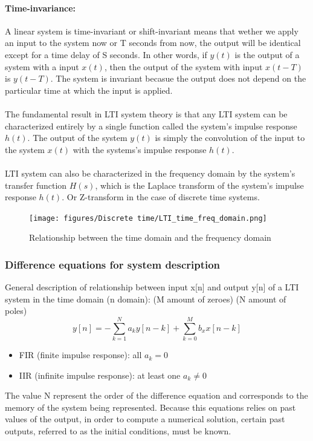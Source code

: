 \documentclass{article}
\begin{document}
\paragraph{Time-invariance:} 
A linear system is time-invariant or shift-invariant means that wether we apply an input to the system now or T seconds from now, the output will be identical except for a time delay of S seconds. In other words, if $y(t)$ is the output of a system with a input $x(t)$, then the output of the system with input $x(t-T)$ is $y(t-T)$. The system is invariant becasue the output does not depend on the particular time at which the input is applied.
\\
\\
The fundamental result in LTI system theory is that any LTI system can be characterized entirely by a single function called the system's impulse response $h(t)$. The output of the system $y(t)$ is simply the convolution of the input to the system $x(t)$ with the systems's impulse response $h(t)$.
\\
\\
LTI system can also be characterized in the frequency domain by the system's transfer function $H(s)$, which is the Laplace transform of the system's impulse response $h(t)$. Or Z-transform in the case of discrete time systems.
\begin{figure}[h!]
    \centering
    \texttt{[image: figures/Discrete time/LTI\_time\_freq\_domain.png]}
    \caption{Relationship between the time domain and the frequency domain}
    \label{fig:lti_relationship}
\end{figure}

\subsubsection{Difference equations for system description} %
General description of relationship between input x[n] and output y[n] of a LTI system in the time domain (n domain): (M amount of zeroes) (N amount of poles)
\begin{equation}
    y[n] = -\sum_{k=1}^{N}a_ky[n-k] + \sum_{k=0}^{M}b_xx[n-k]
\end{equation}
\begin{itemize}
    \item FIR (finite impulse response): all $a_k = 0$
    \item IIR (infinite impulse response): at least one $a_k \neq 0$
\end{itemize}
The value N represent the order of the difference equation and corresponds to the memory of the system being represented. Because this equations relies on past values of the output, in order to compute a numerical solution, certain past outputs, referred to as the initial conditions, must be known.
\end{document}
